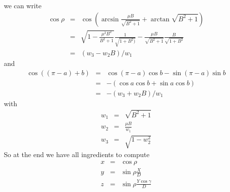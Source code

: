       we can write
      \begin{eqnarray}
        \cos \rho & = & \cos\left(\arcsin \frac{\mu B}{\sqrt{B^2 + 1}} + \arctan\sqrt{B^2 + 1}\right) \\
		  & = & \sqrt{1 - \frac{\mu^2B^2}{B^2 + 1}}  \frac{1}{\sqrt{1 + B^2)}}
		      - \frac{\mu B}{\sqrt{B^2 + 1}}         \frac{B}{\sqrt{1 + B^2}} \\
		  & = & (w_3 - w_2 B) / w_1
      \end{eqnarray}
      and
      \begin{eqnarray}
        \cos((\pi-a)+b) & = & \cos(\pi - a)\cos b - \sin(\pi - a)\sin b \\
			& = & -(\cos a\cos b + \sin a\cos b) \\
			& = & -(w_3 + w_2B) /w_1
      \end{eqnarray}
      with
      \begin{eqnarray}
        w_1 & = & \sqrt{B^2+1}  \\
        w_2 & = & \frac{\mu B}{w_1} \\
        w_3 & = & \sqrt{1 - w_2^2}
      \end{eqnarray}
      So at the end we have all ingredients to compute
      \begin{eqnarray}
        x & = & \cos\rho \\
	y & = & \sin\rho \frac{X}{D} \\
	z & = & \sin\rho \frac{Y\cos\gamma}{D}
      \end{eqnarray}

